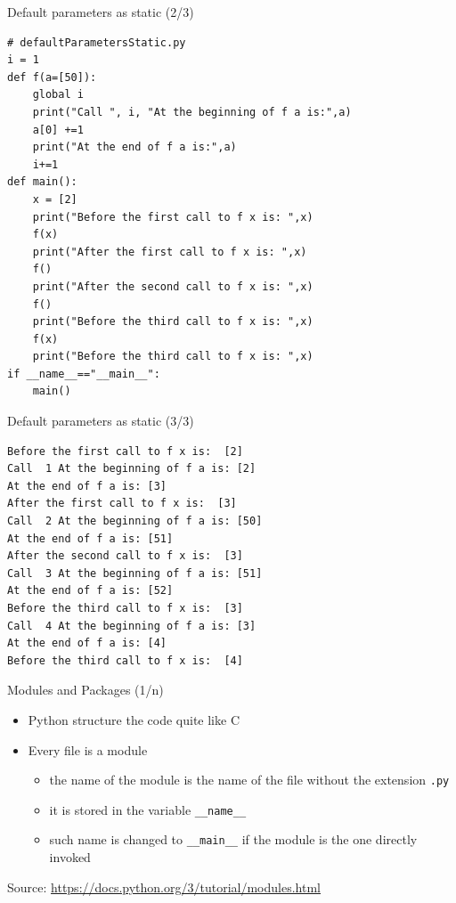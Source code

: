 \documentclass{beamer}
\begin{document}
\begin{frame}[fragile]
{\centerline{Default parameters as static (2/3)}}
\begin{lstlisting}[style=myPythonStyle]
# defaultParametersStatic.py
i = 1
def f(a=[50]):
	global i
	print("Call ", i, "At the beginning of f a is:",a)
	a[0] +=1
	print("At the end of f a is:",a)
	i+=1
def main():
	x = [2]
	print("Before the first call to f x is: ",x)
	f(x)
	print("After the first call to f x is: ",x)
	f()
	print("After the second call to f x is: ",x)
	f()
	print("Before the third call to f x is: ",x)
	f(x)
	print("Before the third call to f x is: ",x)
if __name__=="__main__":
	main()
\end{lstlisting}

\end{frame}

\begin{frame}[fragile]
{\centerline{Default parameters as static (3/3)}}
\begin{lstlisting}[style=myPythonStyle]
% python3.11 defaultParametersStatic.py
Before the first call to f x is:  [2]
Call  1 At the beginning of f a is: [2]
At the end of f a is: [3]
After the first call to f x is:  [3]
Call  2 At the beginning of f a is: [50]
At the end of f a is: [51]
After the second call to f x is:  [3]
Call  3 At the beginning of f a is: [51]
At the end of f a is: [52]
Before the third call to f x is:  [3]
Call  4 At the beginning of f a is: [3]
At the end of f a is: [4]
Before the third call to f x is:  [4]
\end{lstlisting}

\end{frame}

\begin{frame}[fragile]
{\centerline{Modules and Packages (1/n)}}
\begin{itemize}
       \item Python structure the code quite like C
       \item Every file is a module
       \begin{itemize}
		\item the name of the module is the name of the file without the extension \texttt{.py}
		\item it is stored in the variable \texttt{\_\_name\_\_}
		\item such name is changed to \texttt{\_\_main\_\_} if the module is the one directly invoked
        \end{itemize}
    \end{itemize}
    \begin{center}
	\tiny Source: \url{https://docs.python.org/3/tutorial/modules.html}
    \end{center}
\end{frame}
\end{document}
